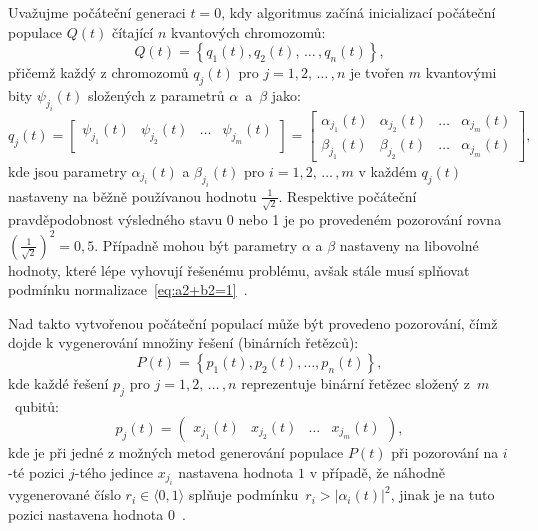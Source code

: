 Uvažujme počáteční generaci $t=0$, kdy algoritmus začíná inicializací počáteční populace $Q\left(t\right)$ čítající $n$ kvantových chromozomů:
\begin{equation}\label{eq:q(t)}
    Q\left(t\right) = \left\{ q_1\left(t\right), q_2\left(t\right),\,\dots\,, q_n\left(t\right) \right\},
\end{equation}
přičemž každý z chromozomů $q_j\left(t\right)$ pro $j = 1,2,\,\dots\,,n$ je tvořen $m$ kvantovými bity $\psi_{j_i}\left(t\right)$ složených z parametrů $\alpha$~a~$\beta$ jako:
\begin{equation*}
    q_j\left(t\right) =
    \begin{bmatrix}
        \psi_{j_1}\left(t\right) & \psi_{j_2}\left(t\right) & \dots & \psi_{j_m}\left(t\right) \\
    \end{bmatrix}
    =
    \begin{bmatrix}
        \alpha_{j_1}\left(t\right) & \alpha_{j_2}\left(t\right) & \dots & \alpha_{j_m}\left(t\right) \\
        \beta_{j_1}\left(t\right)  & \beta_{j_2}\left(t\right)  & \dots & \alpha_{j_m}\left(t\right)
    \end{bmatrix},
\end{equation*}
kde jsou parametry $\alpha_{j_i}\left(t\right)$ a $\beta_{j_i}\left(t\right)$ pro $i = 1,2,\,\dots\,,m$ v každém $q_j\left(t\right)$ nastaveny na běžně používanou hodnotu $\frac{1}{\sqrt{2}}$. 
Respektive počáteční pravděpodobnost výsledného stavu 0 nebo 1 je po provedeném pozorování rovna $\left(\frac{1}{\sqrt{2}}\right)^2 = 0,5$. 
Případně mohou být parametry $\alpha$ a $\beta$ nastaveny na libovolné hodnoty, které lépe vyhovují řešenému problému, avšak stále musí splňovat podmínku normalizace~\ref{eq:a2+b2=1}~\cite{NaturalComputing,qiga}. 

Nad takto vytvořenou počáteční populací může být provedeno pozorování, čímž dojde k vygenerování množiny řešení (binárních řetězců):
\begin{equation}\label{eq:p(t)}
    P\left(t\right) = \left\{ p_1\left(t\right), p_2\left(t\right), \dots, p_n\left(t\right) \right\},
\end{equation}
kde každé řešení $p_j$ pro $j = 1, 2,\,\dots\,, n$ reprezentuje binární řetězec složený z~$m$~qubitů:
\begin{equation*}
    p_j\left(t\right) = 
    \begin{pmatrix}
        x_{j_1}\left(t\right) & x_{j_2}\left(t\right) & \dots & x_{j_m}\left(t\right)
    \end{pmatrix},
\end{equation*}
kde je při jedné z možných metod generování populace $P\left(t\right)$ při pozorování na $i$-té pozici $j$-tého jedince $x_{j_{i}}$ nastavena hodnota $1$ v případě, že náhodně vygenerované číslo $r_i \in \langle 0, 1\rangle$ splňuje podmínku~$r_i > \left| \alpha_i\left(t\right) \right|^2$, jinak je na tuto pozici nastavena hodnota $0$~\cite{NaturalComputing,qiga}.

